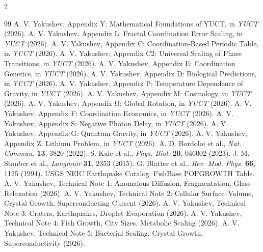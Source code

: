 \documentclass[11pt,a4paper]{article}
\begin{document}
\begin{multicols}{2}
		\begin{thebibliography}{99}
			 A. V. Yakushev, Appendix Y: Mathematical Foundations of YUCT, in \emph{YUCT} (2026).
			 A. V. Yakushev, Appendix L: Fractal Coordination Error Scaling, in \emph{YUCT} (2026).
			 A. V. Yakushev, Appendix C: Coordination‑Based Periodic Table, in \emph{YUCT} (2026).
			 A. V. Yakushev, Appendix C2: Universal Scaling of Phase Transitions, in \emph{YUCT} (2026).
			 A. V. Yakushev, Appendix E: Coordination Genetics, in \emph{YUCT} (2026).
			 A. V. Yakushev, Appendix D: Biological Predictions, in \emph{YUCT} (2026).
			 A. V. Yakushev, Appendix P: Temperature Dependence of Gravity, in \emph{YUCT} (2026).
			 A. V. Yakushev, Appendix M: Cosmology, in \emph{YUCT} (2026).
			 A. V. Yakushev, Appendix Ω: Global Rotation, in \emph{YUCT} (2026).
			 A. V. Yakushev, Appendix F: Coordination Economics, in \emph{YUCT} (2026).
			 A. V. Yakushev, Appendix S: Negative Photon Delay, in \emph{YUCT} (2026).
			 A. V. Yakushev, Appendix G: Quantum Gravity, in \emph{YUCT} (2026).
			 A. V. Yakushev, Appendix Z: Lithium Problem, in \emph{YUCT} (2026).
			 A. D. Bordoloi et al., \emph{Nat. Commun.} \textbf{13}, 3820 (2022).
			 S. Kale et al., \emph{Phys. Biol.} \textbf{20}, 046002 (2023).
			 J. M. Stauber et al., \emph{Langmuir} \textbf{31}, 2353 (2015).
			 G. Blatter et al., \emph{Rev. Mod. Phys.} \textbf{66}, 1125 (1994).
			 USGS NEIC Earthquake Catalog.
			 FishBase POPGROWTH Table.
			 A. V. Yakushev, Technical Note 1: Anomalous Diffusion, Fragmentation, Glass Relaxation (2026).
			 A. V. Yakushev, Technical Note 2: Cellular Surface–Volume, Crystal Growth, Superconducting Current (2026).
			 A. V. Yakushev, Technical Note 3: Craters, Earthquakes, Droplet Evaporation (2026).
			 A. V. Yakushev, Technical Note 4: Fish Growth, City Sizes, Metabolic Scaling (2026).
			 A. V. Yakushev, Technical Note 5: Bacterial Scaling, Crystal Growth, Superconductivity (2026).
		\end{thebibliography}
		
	\end{multicols}
\end{document}

